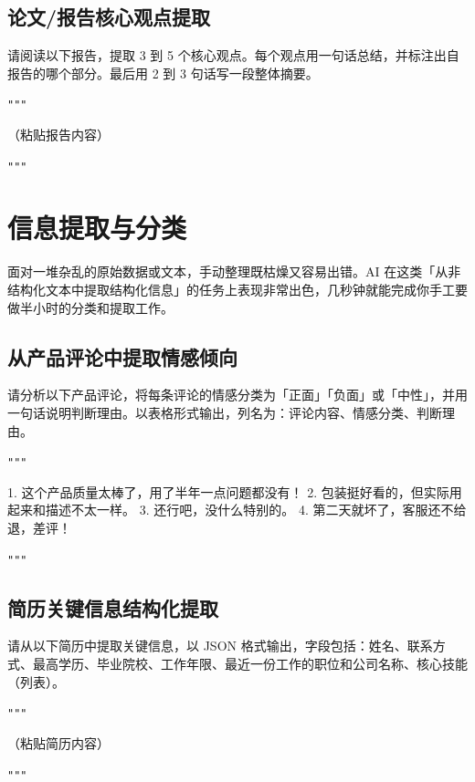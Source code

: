 \subsection*{论文/报告核心观点提取}

\begin{promptbox}
请阅读以下报告，提取 3 到 5 个核心观点。每个观点用一句话总结，并标注出自报告的哪个部分。最后用 2 到 3 句话写一段整体摘要。

\verb|"""|

（粘贴报告内容）

\verb|"""|
\end{promptbox}

\section{信息提取与分类}

面对一堆杂乱的原始数据或文本，手动整理既枯燥又容易出错。AI 在这类「从非结构化文本中提取结构化信息」的任务上表现非常出色，几秒钟就能完成你手工要做半小时的分类和提取工作。

\subsection*{从产品评论中提取情感倾向}

\begin{promptbox}
请分析以下产品评论，将每条评论的情感分类为「正面」「负面」或「中性」，并用一句话说明判断理由。以表格形式输出，列名为：评论内容、情感分类、判断理由。

\verb|"""|

1. 这个产品质量太棒了，用了半年一点问题都没有！
2. 包装挺好看的，但实际用起来和描述不太一样。
3. 还行吧，没什么特别的。
4. 第二天就坏了，客服还不给退，差评！

\verb|"""|
\end{promptbox}

\subsection*{简历关键信息结构化提取}

\begin{promptbox}
请从以下简历中提取关键信息，以 JSON 格式输出，字段包括：姓名、联系方式、最高学历、毕业院校、工作年限、最近一份工作的职位和公司名称、核心技能（列表）。

\verb|"""|

（粘贴简历内容）

\verb|"""|
\end{promptbox}

